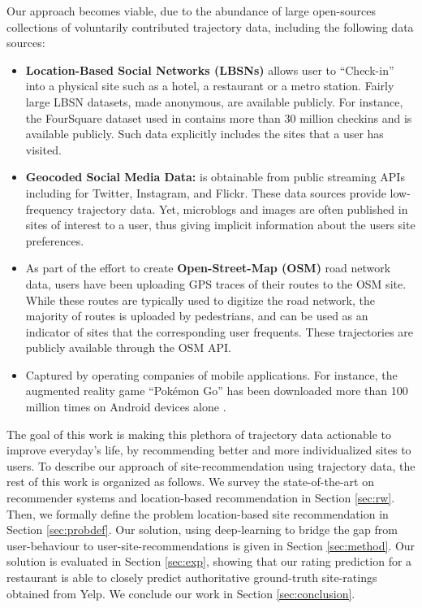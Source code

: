 Our approach becomes viable, due to the abundance of large open-sources collections of voluntarily contributed trajectory data, including the following data sources:
 \begin{itemize}
\item {\bf Location-Based Social Networks (LBSNs)} allows user to ``Check-in'' into a physical site such as a hotel, a restaurant or a metro station. Fairly large LBSN datasets, made anonymous, are available publicly. For instance, the FourSquare dataset used in \cite{yang2014modeling} contains more than 30 million checkins and is available publicly. Such data explicitly includes the sites that a user has visited.
\item {\bf Geocoded Social Media Data: } is obtainable from public streaming APIs including for Twitter, Instagram, and Flickr. These data sources provide low-frequency trajectory data. Yet, microblogs and images are often published in sites of interest to a user, thus giving implicit information about the users site preferences.
\item  As part of the effort to create {\bf Open-Street-Map (OSM)} \cite{OSM,hw-osmugsm-08} road network data, users have been uploading GPS traces of their routes to the OSM site. While these routes are typically used to digitize the road network, the majority of routes is uploaded by pedestrians, and can be used as an indicator of sites that the corresponding user frequents. These trajectories are publicly available through the OSM API.
\item Captured by operating companies of mobile applications. For instance, the augmented reality game ``Pok\'emon Go'' has been downloaded more than 100 million times on Android devices alone \cite{pokemongo}.
\end{itemize}
The goal of this work is making this plethora of trajectory data actionable to improve everyday's life, by recommending better and more individualized sites to users.
To describe our approach of site-recommendation using trajectory data, the rest of this work is organized as follows. We survey the state-of-the-art on recommender systems and location-based recommendation in Section \ref{sec:rw}. Then, we formally define the problem location-based site recommendation in Section \ref{sec:probdef}. Our solution, using deep-learning to bridge the gap from user-behaviour to user-site-recommendations is given in Section \ref{sec:method}. Our solution is evaluated in Section \ref{sec:exp}, showing that our rating prediction for a restaurant is able to closely predict authoritative ground-truth site-ratings obtained from Yelp. We conclude our work in Section \ref{sec:conclusion}.  